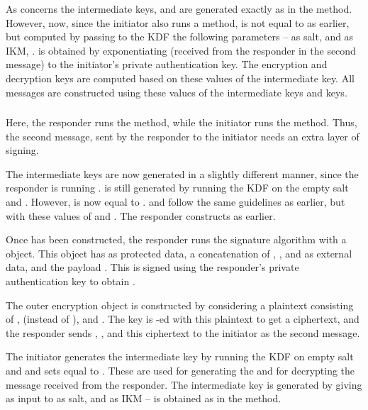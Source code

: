 {As concerns the intermediate keys, \mPRKtwo{} and \mPRKthree{} are generated
exactly as in the \mSigStat{} method. However, now, since the initiator also
runs a \mStat{} method, \mPRKfour{} is not equal to \mPRKthree{} as earlier, but
computed by passing to the KDF the following parameters -- as salt, \mPRKthree{}
and as IKM, \mGiy. \mGiy{} is obtained by exponentiating \mGy{} (received from
the responder in the second message) to the initiator's private authentication
key. The encryption and decryption keys are computed based on these values of
the intermediate key. All messages are constructed using these values of the
intermediate keys and keys.

\subsubsection{\mStatSig}
Here, the responder runs the \mSig{} method, while the initiator runs the \mStat{} method. Thus, the second message, sent by the responder to the initiator needs an extra layer of signing. 

The intermediate keys are now generated in a slightly different manner, since
the responder is running \mSig. \mPRKtwo{} is still generated by running the KDF
on the empty salt and \mGxy. However, \mPRKthree{} is now equal to \mPRKtwo.
\mKtwom{} and \mKtwoe{} follow the same guidelines as earlier, but with these
values of \mPRKtwo{} and \mPRKthree. The responder constructs \mMactwo{} as earlier.

Once \mMactwo{} has been constructed, the responder runs the signature algorithm
with a \mCose{} object. This object has \mIdcredr{} as protected data, a
concatenation of \mTHtwo, \mCredr, and \mADtwo{} as external data, and the payload \mMactwo. This is signed using the responder's private authentication key to obtain \mSigtwo.

The outer encryption object is constructed by considering a plaintext consisting
of \mCredr, \mSigtwo{} (instead of \mMactwo), and \mADtwo. The key \mKtwoae{} is \mXor-ed with this plaintext to get a ciphertext, and the responder sends \mGy, \mCr, and this ciphertext to the initiator as the second message.

The initiator generates the intermediate key \mPRKtwo by running the KDF on
empty salt and \mGxy{} and sets \mPRKthree{} equal to \mPRKtwo. These are used
for generating the \mKtwom{} and \mKtwoe{} for decrypting the message received
from the responder. The intermediate key \mPRKfour{} is generated by giving as
input to \mHkdfExtract{} \mPRKthree{} as salt, and \mGiy{} as IKM -- \mGiy{} is
obtained as in the \mStatStat{} method.

}
